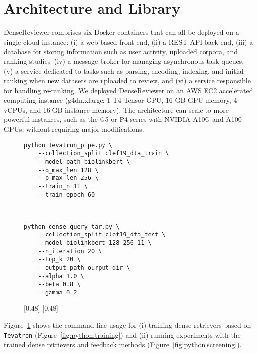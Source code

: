 \section{Architecture and Library}
DenseReviewer comprises six Docker containers that can all be deployed on a single cloud instance:\enlargethispage{2\baselineskip} (i) a web-based front end, (ii) a REST API back end, (iii) a database for storing information such as user activity, uploaded corpora, and ranking studies, (iv) a message broker for managing asynchronous task queues, (v) a service dedicated to tasks such as parsing, encoding, indexing, and initial ranking when new datasets are uploaded to review, and (vi) a service responsible for handling re-ranking. We deployed DenseReviewer on an AWS EC2 accelerated computing instance (g4dn.xlarge: 1 T4 Tensor GPU, 16 GB GPU memory, 4 vCPUs, and 16 GB instance memory). The architecture can scale to more powerful instances, such as the G5 or P4 series with NVIDIA A10G and A100 GPUs, without requiring major modifications. 

\begin{figure}[t!]
\lstset{basicstyle=\ttfamily, columns=fullflexible, keepspaces=true,frame=tb}
\scriptsize
\newsavebox{\training}
\begin{lrbox}{\training}
\begin{minipage}{.48\textwidth}
\begin{lstlisting}
python tevatron_pipe.py \
	--collection_split clef19_dta_train \
	--model_path biolinkbert \
	--q_max_len 128 \
	--p_max_len 256 \
	--train_n 11 \
	--train_epoch 60
	
	
\end{lstlisting}
\end{minipage}
\end{lrbox}
\newsavebox{\screening}
\begin{lrbox}{\screening}
\begin{minipage}{.48\textwidth}
\begin{lstlisting}
python dense_query_tar.py \
	--collection_split clef19_dta_test \
	--model biolinkbert_128_256_11 \
	--n_iteration 20 \
	--top_k 20 \
	--output_path ourput_dir \
	--alpha 1.0 \
	--beta 0.8 \
	--gamma 0.2
\end{lstlisting}
\end{minipage}
\end{lrbox}
[0.48\textwidth]{\usebox{\training}}
[0.48\textwidth]{\usebox{\screening}}
\setcounter{figure}{2}    
\label{fig:python}
\end{figure}

Figure~\ref{fig:python} shows the command line usage for (i) training dense retrievers based on \texttt{Tevatron} (Figure~\ref{fig:python.training}) and (ii)  running experiments with the trained dense retrievers and feedback methods (Figure~\ref{fig:python.screening}).
